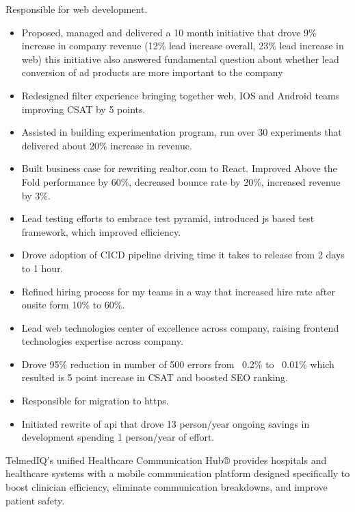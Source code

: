 \documentclass[11pt,a4paper,roman]{moderncv}       %
\begin{document}
Responsible for web development. 
\begin{itemize}
    \item Proposed, managed and delivered a 10 month initiative that drove 9\% increase in company revenue (12\% lead increase overall, 23\% lead increase in web) this initiative also answered fundamental question about whether lead conversion of ad products are more important to the company
    \item Redesigned filter experience bringing together web, IOS and Android teams improving CSAT by 5 points.
    \item Assisted in building experimentation program, run over 30 experiments that delivered about 20\% increase in revenue.
    \item Built business case for rewriting realtor.com to React. Improved Above the Fold performance by 60\%, decreased bounce rate by 20\%, increased revenue by 3\%.
    \item Lead testing efforts to embrace test pyramid, introduced js based test framework, which improved efficiency.
    \item Drove adoption of CICD pipeline driving time it takes to release from 2 days to 1 hour.
    \item Refined hiring process for my teams in a way that increased hire rate after onsite form 10\% to 60\%.
    \item Lead web technologies center of excellence across company, raising frontend technologies expertise across company.
    \item Drove 95\% reduction in number of 500 errors from ~0.2\% to ~0.01\% which resulted is 5 point increase in CSAT and boosted SEO ranking.
    \item Responsible for migration to https.
    \item Initiated rewrite of api that drove 13 person/year ongoing savings in development spending 1 person/year of effort.
\end{itemize}
\vspace{16pt}


TelmedIQ’s unified Healthcare Communication Hub® provides hospitals and healthcare systems with a mobile communication platform designed specifically to boost clinician efficiency, eliminate communication breakdowns, and improve patient safety.
\end{document}

